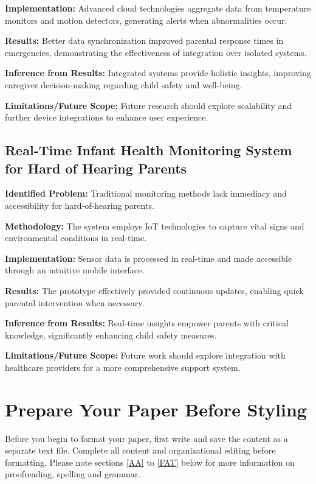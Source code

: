 \documentclass[conference]{IEEEtran}
\begin{document}
\textbf{Implementation:} Advanced cloud technologies aggregate data from temperature monitors and motion detectors, generating alerts when abnormalities occur.

\textbf{Results:} Better data synchronization improved parental response times in emergencies, demonstrating the effectiveness of integration over isolated systems.

\textbf{Inference from Results:} Integrated systems provide holistic insights, improving caregiver decision-making regarding child safety and well-being.

\textbf{Limitations/Future Scope:} Future research should explore scalability and further device integrations to enhance user experience.

\subsection{Real-Time Infant Health Monitoring System for Hard of Hearing Parents}
\textbf{Identified Problem:} Traditional monitoring methods lack immediacy and accessibility for hard-of-hearing parents.

\textbf{Methodology:} The system employs IoT technologies to capture vital signs and environmental conditions in real-time.

\textbf{Implementation:} Sensor data is processed in real-time and made accessible through an intuitive mobile interface.

\textbf{Results:} The prototype effectively provided continuous updates, enabling quick parental intervention when necessary.

\textbf{Inference from Results:} Real-time insights empower parents with critical knowledge, significantly enhancing child safety measures.

\textbf{Limitations/Future Scope:} Future work should explore integration with healthcare providers for a more comprehensive support system.






\section{Prepare Your Paper Before Styling}
Before you begin to format your paper, first write and save the content as a 
separate text file. Complete all content and organizational editing before 
formatting. Please note sections \ref{AA} to \ref{FAT} below for more information on 
proofreading, spelling and grammar.
\end{document}
